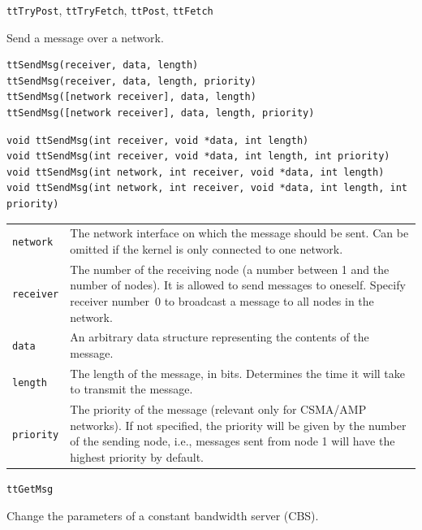 \documentclass[final,twoside]{rapport}
\begin{document}
\seealso
{\tt ttTryPost}, {\tt ttTryFetch}, {\tt ttPost},
{\tt ttFetch}



\purpose
Send a message over a network.

\Msyntax
\begin{verbatim}
ttSendMsg(receiver, data, length)
ttSendMsg(receiver, data, length, priority)
ttSendMsg([network receiver], data, length)
ttSendMsg([network receiver], data, length, priority)
\end{verbatim}

\Csyntax
\begin{verbatim}
void ttSendMsg(int receiver, void *data, int length)
void ttSendMsg(int receiver, void *data, int length, int priority)
void ttSendMsg(int network, int receiver, void *data, int length)
void ttSendMsg(int network, int receiver, void *data, int length, int priority)
\end{verbatim}

\args
\begin{tabularx}{\hsize}{l>{\raggedright\arraybackslash}X}
  {\tt network} & The network interface on which the message should be
  sent. Can be omitted if the kernel is only connected to one network.  \\
  {\tt receiver} & The number of the receiving node (a number between
  1 and the number of nodes). It is allowed to send messages to
  oneself. Specify receiver number~0 to broadcast a message to all
  nodes in the network. \\
  {\tt data} & An arbitrary data structure representing the contents
  of the message. \\
  {\tt length} & The length of the message, in bits.
  Determines the time it will take to transmit the message.\\
  {\tt priority} & The priority of the message (relevant only for
  CSMA/AMP networks). If not specified, the priority will be
  given by the number of the sending node, i.e., messages sent from
  node 1 will have the highest priority by default.
\end{tabularx}

\seealso
\texttt{ttGetMsg}



\purpose
Change the parameters of a constant bandwidth server (CBS).
\end{document}
